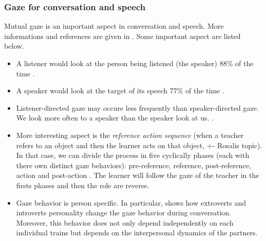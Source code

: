 \documentclass[11pt,a4paper]{article}
\begin{document}
\subsubsection{Gaze for conversation and speech} 
Mutual gaze is an important aspect in conversation and speech. More informations and references are given in \cite[Section~3.1]{Admoni2017}. Some important aspect are listed below.
\begin{itemize}
\item A listener would look at the person being listened (the speaker) 88\% of the time \cite{Vertegaal2002}.
\item A speaker would look at the target of its speech 77\% of the time \cite{Vertegaal2002}.
\item Listener-directed gaze may occure less frequently than speaker-directed gaze. We look more often to a speaker than the speaker look at us. \cite{Cook1977}.
\item More interesting aspect is the \textit{reference action sequence} (when a teacher refers to an object and then the learner acts on that object, +- Rosalis topic). In that case, we can divide the process in five cyclically phases (each with there own distinct gaze behaviors): pre-reference, reference, post-reference, action and post-action \cite{Andrist2015}. The learner will follow the gaze of the teacher in the firsts phases and then the role are reverse.
\item Gaze behavior is person specific. In particular, \cite{Andrist2015April} shows how extroverts and introverts personality change the gaze behavior during conversation. Moreover, this behavior does not only depend independently on each individual trains but depends on the interpersonal dynamics of the partners.
\end{itemize}
\end{document}
